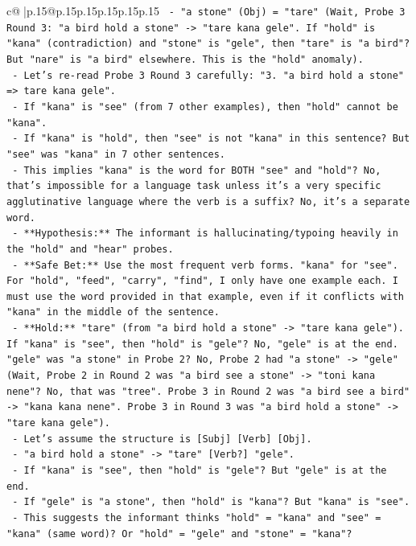 \documentclass{article}
\begin{document}
{\begin{supertabular}{c@{$\;$}|p{.15\linewidth}@{}p{.15\linewidth}p{.15\linewidth}p{.15\linewidth}p{.15\linewidth}p{.15\linewidth}}
{{{\texttt{          {-} "a stone" (Obj) = "tare" (Wait, Probe 3 Round 3: "a bird hold a stone" {-}> "tare kana gele". If "hold" is "kana" (contradiction) and "stone" is "gele", then "tare" is "a bird"? But "nare" is "a bird" elsewhere. This is the "hold" anomaly).} \\
\texttt{          {-} Let's re{-}read Probe 3 Round 3 carefully: "3. "a bird hold a stone" => tare kana gele".} \\
\texttt{            {-} If "kana" is "see" (from 7 other examples), then "hold" cannot be "kana".} \\
\texttt{            {-} If "kana" is "hold", then "see" is not "kana" in this sentence? But "see" was "kana" in 7 other sentences.} \\
\texttt{            {-} This implies "kana" is the word for BOTH "see" and "hold"? No, that's impossible for a language task unless it's a very specific agglutinative language where the verb is a suffix? No, it's a separate word.} \\
\texttt{            {-} **Hypothesis:** The informant is hallucinating/typoing heavily in the "hold" and "hear" probes.} \\
\texttt{            {-} **Safe Bet:** Use the most frequent verb forms. "kana" for "see". For "hold", "feed", "carry", "find", I only have one example each. I must use the word provided in that example, even if it conflicts with "kana" in the middle of the sentence.} \\
\texttt{            {-} **Hold:** "tare" (from "a bird hold a stone" {-}> "tare kana gele"). If "kana" is "see", then "hold" is "gele"? No, "gele" is at the end. "gele" was "a stone" in Probe 2? No, Probe 2 had "a stone" {-}> "gele" (Wait, Probe 2 in Round 2 was "a bird see a stone" {-}> "toni kana nene"? No, that was "tree". Probe 3 in Round 2 was "a bird see a bird" {-}> "kana kana nene". Probe 3 in Round 3 was "a bird hold a stone" {-}> "tare kana gele").} \\
\texttt{            {-} Let's assume the structure is {[}Subj{]} {[}Verb{]} {[}Obj{]}.} \\
\texttt{            {-} "a bird hold a stone" {-}> "tare" {[}Verb?{]} "gele".} \\
\texttt{            {-} If "kana" is "see", then "hold" is "gele"? But "gele" is at the end.} \\
\texttt{            {-} If "gele" is "a stone", then "hold" is "kana"? But "kana" is "see".} \\
\texttt{            {-} This suggests the informant thinks "hold" = "kana" and "see" = "kana" (same word)? Or "hold" = "gele" and "stone" = "kana"?} \\
}}}
\end{supertabular}}
\end{document}
